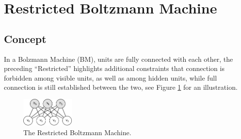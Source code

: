 \documentclass[11pt]{article}
\begin{document}
{\section{Restricted Boltzmann Machine}
\subsection{Concept}
In a Bolzmann Machine (BM), units are fully connected with each other, the preceding ``Restricted'' highlights additional constraints that connection is forbidden among visible units, as well as among hidden units, while full connection is still established between the two, see Figure \ref{fig:rbm} for an illustration.
\begin{figure}[h]
  \centering
  \includegraphics[width=100px]{img/rbm.png}
  \caption{The Restricted Boltzmann Machine.}\label{fig:rbm}
\end{figure}
}
\end{document}
